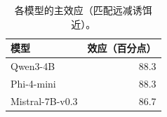 \begin{table}[t]
\centering
\caption{各模型的主效应（匹配远减诱饵近）。}
\label{tab:model}
\begin{tabular}{lr}
\toprule
模型 & 效应（百分点） \\
\midrule
Qwen3-4B & 88.3 \\
Phi-4-mini & 88.3 \\
Mistral-7B-v0.3 & 86.7 \\
\bottomrule
\end{tabular}
\end{table}
